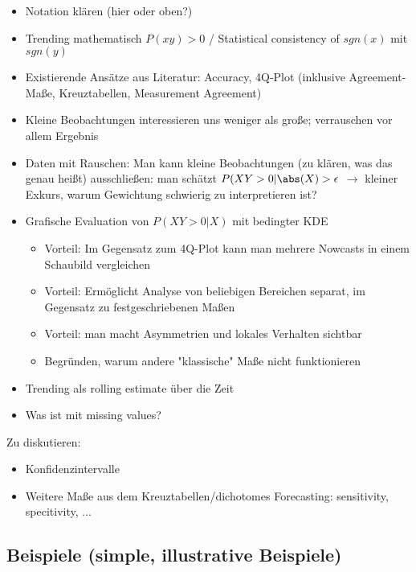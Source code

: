 
\begin{itemize}
    \item Notation klären (hier oder oben?)
    \item Trending mathematisch $P(x y) > 0$ / Statistical consistency of $sgn(x)$ mit $sgn(y)$
    \item Existierende Ansätze aus Literatur: Accuracy, 4Q-Plot (inklusive Agreement-Maße, Kreuztabellen, Measurement Agreement)
    \item Kleine Beobachtungen interessieren uns weniger als große; verrauschen vor allem Ergebnis
    \item Daten mit Rauschen: Man kann kleine Beobachtungen (zu klären, was das genau heißt) ausschließen: man schätzt $P(XY > 0 | \abs (X) > \epsilon$ $\rightarrow$ kleiner Exkurs, warum Gewichtung schwierig zu interpretieren ist?
    \item Grafische Evaluation von $P(XY > 0 | X)$ mit bedingter KDE
    \begin{itemize}
        \item Vorteil: Im Gegensatz zum 4Q-Plot kann man mehrere Nowcasts in einem Schaubild vergleichen
        \item Vorteil: Ermöglicht Analyse von beliebigen Bereichen separat, im Gegensatz zu festgeschriebenen Maßen
        \item Vorteil: man macht Asymmetrien und lokales Verhalten sichtbar 
        \item Begründen, warum andere "klassische" Maße nicht funktionieren
    \end{itemize}
    \item Trending als rolling estimate über die Zeit
    \item Was ist mit missing values?
\end{itemize}

Zu diskutieren:
\begin{itemize}
    \item Konfidenzintervalle
    \item Weitere Maße aus dem Kreuztabellen/dichotomes Forecasting: sensitivity, specitivity, ...
\end{itemize}

\subsection{Beispiele (simple, illustrative Beispiele)}